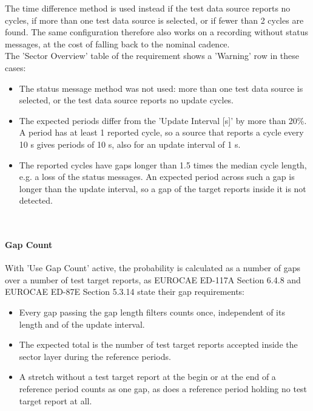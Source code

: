 The time difference method is used instead if the test data source reports no cycles, if more than one test data source is selected, or if fewer than 2 cycles are found. The same configuration therefore also works on a recording without status messages, at the cost of falling back to the nominal cadence. \\

The 'Sector Overview' table of the requirement shows a 'Warning' row in these cases:
\begin{itemize}
\item The status message method was not used: more than one test data source is selected, or the test data source reports no update cycles.
\item The expected periods differ from the 'Update Interval [s]' by more than 20\%. A period has at least 1 reported cycle, so a source that reports a cycle every 10 s gives periods of 10 s, also for an update interval of 1 s.
\item The reported cycles have gaps longer than 1.5 times the median cycle length, e.g. a loss of the status messages. An expected period across such a gap is longer than the update interval, so a gap of the target reports inside it is not detected.
\end{itemize}
\ \\

\paragraph{Gap Count}

With 'Use Gap Count' active, the probability is calculated as a number of gaps over a number of test target reports, as EUROCAE ED-117A Section 6.4.8 and EUROCAE ED-87E Section 5.3.14 state their gap requirements:

\begin{itemize}
\item Every gap passing the gap length filters counts once, independent of its length and of the update interval.
\item The expected total is the number of test target reports accepted inside the sector layer during the reference periods.
\item A stretch without a test target report at the begin or at the end of a reference period counts as one gap, as does a reference period holding no test target report at all.
\end{itemize}
\ \\

